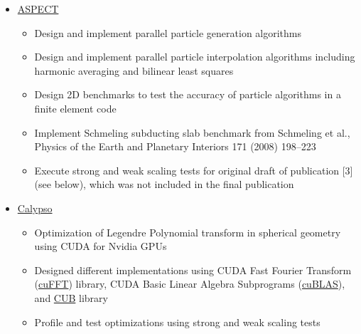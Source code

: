 \documentclass[11pt]{ltxdoc}
\begin{document}
\begin{description}
\begin{description}
      \vskip 06pt
      

      \begin{itemize}
      	
        \item \href{https://geodynamics.org/cig/software/aspect/}{ASPECT}
              
          \begin{itemize}        
            
            \item Design and implement parallel particle generation algorithms
           
            \item Design and implement parallel particle interpolation algorithms including harmonic averaging and bilinear least squares
           
            \item Design 2D benchmarks to test the accuracy of particle algorithms in a finite element code
           
            \item Implement Schmeling subducting slab benchmark from Schmeling et al., Physics of the Earth and Planetary Interiors 171 (2008) 198--223
            
            \item Execute strong and weak scaling tests for original draft of publication [3] (see below), which was not included in the final publication              

           \end{itemize}

        \item       \href{https://geodynamics.org/cig/software/calypso/}{Calypso}         

          \begin{itemize}
          	
          	\item Optimization of Legendre Polynomial transform in spherical geometry using CUDA for Nvidia GPUs 
          	
          	\item Designed different implementations using CUDA Fast Fourier Transform (\href{https://docs.nvidia.com/cuda/cufft/index.html}{cuFFT}) library, CUDA Basic Linear Algebra Subprograms (\href{https://docs.nvidia.com/cuda/cublas/index.html}{cuBLAS}), and \href{https://nvlabs.github.io/cub/}{CUB} library
          	
          	\item Profile and test optimizations using strong and weak scaling tests
          	

\end{itemize}
\end{itemize}
\end{description}
\end{description}
\end{document}
